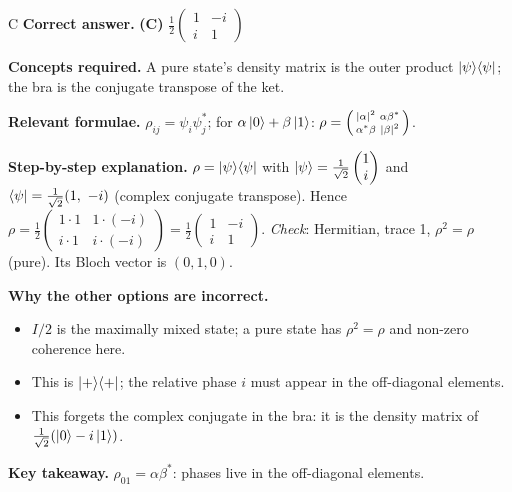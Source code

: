 \documentclass[11pt,a4paper]{article}
\newcommand{\qsep}{\par\vspace{2pt}{\color{black!15}\hrule}\vspace{4pt}}
\begin{document}
\begin{solbox}{C}
\textbf{\color{brand}Correct answer.} \textcolor{okgreen}{\textbf{(C)}} $\frac12\begin{pmatrix}1 & -i\\ i & 1\end{pmatrix}$

\textbf{\color{brand}Concepts required.} A pure state's density matrix is the outer product $\ket\psi\!\bra\psi$; the bra is the conjugate transpose of the ket.

\textbf{\color{brand}Relevant formulae.} $\rho_{ij} = \psi_i\psi_j^*$; for $\alpha\ket0 + \beta\ket1$: $\rho = \begin{psmallmatrix}|\alpha|^2 & \alpha\beta^*\\ \alpha^*\beta & |\beta|^2\end{psmallmatrix}$.

\textbf{\color{brand}Step-by-step explanation.} $\rho = \ket\psi\!\bra\psi$ with $\ket\psi = \frac{1}{\sqrt2}\begin{pmatrix}1\\ i\end{pmatrix}$ and $\bra\psi = \frac{1}{\sqrt2}(1,\ -i)$ (complex conjugate
transpose). Hence $\rho = \frac12\begin{pmatrix}1\cdot1 & 1\cdot(-i)\\ i\cdot1 & i\cdot(-i)\end{pmatrix} = \frac12\begin{pmatrix}1 & -i\\ i & 1\end{pmatrix}$.
\emph{Check}: Hermitian, trace 1, $\rho^2 = \rho$ (pure). Its Bloch vector is $(0, 1, 0)$.

\textbf{\color{brand}Why the other options are incorrect.}
\begin{itemize}[leftmargin=2.4em, itemsep=1pt, topsep=2pt]
\item[\textbf{(A)}] $I/2$ is the maximally mixed state; a pure state has $\rho^2 = \rho$ and non-zero coherence here.
\item[\textbf{(B)}] This is $\ket+\!\bra+$; the relative phase $i$ must appear in the off-diagonal elements.
\item[\textbf{(D)}] This forgets the complex conjugate in the bra: it is the density matrix of $\frac{1}{\sqrt2}(\ket0 - i\ket1)$.
\end{itemize}
\textbf{\color{brand}Key takeaway.} $\rho_{01} = \alpha\beta^*$: phases live in the off-diagonal elements.
\end{solbox}
\qsep
\end{document}
